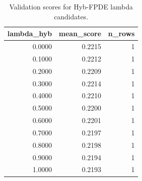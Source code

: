 \begin{table}[t]
\caption{Validation scores for Hyb-FPDE lambda candidates.}
\label{tab:lambda_distribution_computed}
\centering
\begin{tabular}{rrr}
\toprule
lambda\_hyb & mean\_score & n\_rows \\
\midrule
0.0000 & 0.2215 & 1 \\
0.1000 & 0.2212 & 1 \\
0.2000 & 0.2209 & 1 \\
0.3000 & 0.2214 & 1 \\
0.4000 & 0.2210 & 1 \\
0.5000 & 0.2200 & 1 \\
0.6000 & 0.2201 & 1 \\
0.7000 & 0.2197 & 1 \\
0.8000 & 0.2198 & 1 \\
0.9000 & 0.2194 & 1 \\
1.0000 & 0.2193 & 1 \\
\bottomrule
\end{tabular}

\end{table}
